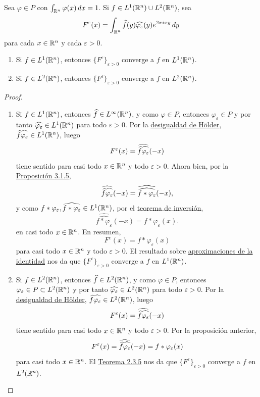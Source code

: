 \documentclass[a4paper, 11pt, oneside]{report}
\begin{document}
\begin{theorem}
  Sea $\varphi \in P$ con $\int_{\mathbb R^n} \varphi(x) \, dx = 1$. Si $f \in L^1(\mathbb R^n) \cup L^2(\mathbb R^n)$, sea
  \[F^\varepsilon(x) = \int_{\mathbb R^n} \widehat{f}(y) \widehat{\varphi_\varepsilon}(y)e^{2\pi i xy} \, dy\]
  para cada $x \in \mathbb R^n$ y cada $\varepsilon > 0$.
  \begin{enumerate}
    \item Si $f \in L^1(\mathbb R^n)$, entonces $\{F^\varepsilon\}_{\varepsilon > 0}$ converge a $f$ en $L^1(\mathbb R^n)$.
    \item Si $f \in L^2(\mathbb R^n)$, entonces $\{F^\varepsilon\}_{\varepsilon > 0}$ converge a $f$ en $L^2(\mathbb R^n)$.
  \end{enumerate}
\end{theorem}

\begin{proof}
  \hfill
  \begin{enumerate}
    \item Si $f \in L^1(\mathbb R^n)$, entonces $\widehat{f} \in L^\infty(\mathbb R^n)$, y como $\varphi \in P$, entonces $\varphi_\varepsilon \in P$ y por tanto $\widehat{\varphi_\varepsilon} \in L^1(\mathbb R^n)$ para todo $\varepsilon > 0$. Por la \hyperref[cor:1.4.4]{\color{c1}desigualdad de Hölder}, $\widehat{f}\widehat{\vphantom{f}\varphi_\varepsilon} \in L^1(\mathbb R^n)$, luego
    \[F^\varepsilon(x) = \widehat{\widehat{f}\widehat{\vphantom{f}\varphi_\varepsilon}}(-x)\]
    tiene sentido para casi todo $x \in \mathbb R^n$ y todo $\varepsilon > 0$. Ahora bien, por la \hyperref[pro:3.1.5]{\color{c1}Proposición 3.1.5},
    \[\widehat{\widehat{f}\widehat{\vphantom{f}\varphi_\varepsilon}}(-x) = \widehat{\widehat{f \ast \varphi_\varepsilon}}(-x),\]
    y como $f \ast \varphi_\varepsilon, \widehat{f \ast \varphi_\varepsilon} \in L^1(\mathbb R^n)$, por el \hyperref[teo:3.2.3]{\color{c1}teorema de inversión},
    \[\widehat{\widehat{f \ast \varphi_\varepsilon}}(-x) = f \ast \varphi_\varepsilon(x).\]
    en casi todo $x \in \mathbb R^n$. En resumen,
    \[F^\varepsilon(x) =  f \ast \varphi_\varepsilon(x)\]
    para casi todo $x \in \mathbb R^n$ y todo $\varepsilon > 0$. El resultado sobre \hyperref[cor:2.3.6]{\color{c1}aproximaciones de la identidad} nos da que $\{F^\varepsilon\}_{\varepsilon > 0}$ converge a $f$ en $L^1(\mathbb R^n)$.
    \item Si $f \in L^2(\mathbb R^n)$, entonces $\widehat{f} \in L^2(\mathbb R^n)$, y como $\varphi \in P$, entonces $\varphi_\varepsilon \in P \subset L^2(\mathbb R^n)$ y por tanto $\widehat{\varphi_\varepsilon} \in L^2(\mathbb R^n)$ para todo $\varepsilon > 0$. Por la \hyperref[cor:1.4.4]{\color{c1}desigualdad de Hölder}, $\widehat{f}\widehat{\vphantom{f}\varphi_\varepsilon} \in L^2(\mathbb R^n)$, luego
    \[F^\varepsilon(x) = \widehat{\widehat{f}\widehat{\vphantom{f}\varphi_\varepsilon}}(-x)\]
    tiene sentido para casi todo $x \in \mathbb R^n$ y todo $\varepsilon > 0$. Por la proposición anterior,
    \[F^\varepsilon(x) = \widehat{\widehat{f}\widehat{\vphantom{f}\varphi_\varepsilon}}(-x) = f \ast \varphi_\varepsilon(x)\]
    para casi todo $x \in \mathbb R^n$. El \hyperref[teo:2.3.5]{\color{c1}Teorema 2.3.5} nos da que $\{F^\varepsilon\}_{\varepsilon > 0}$ converge a $f$ en $L^2(\mathbb R^n)$. \qedhere
  \end{enumerate}
\end{proof}
\end{document}
